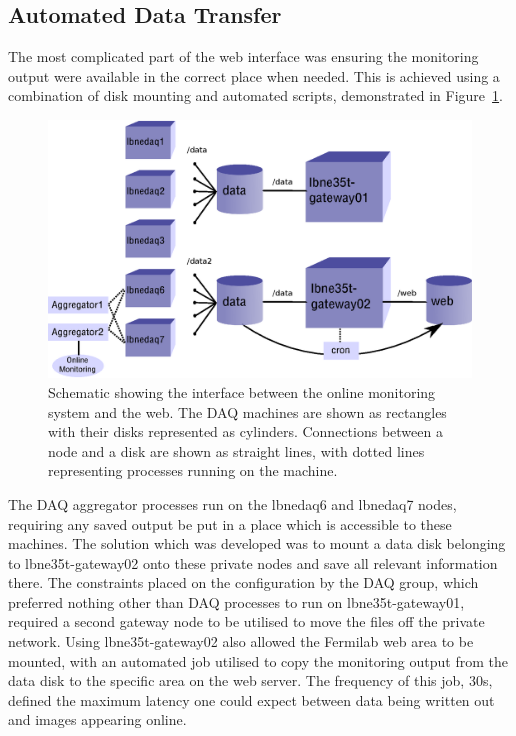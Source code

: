 \subsection{Automated Data Transfer}\label{sec:AutomatedDataTransfer}

The most complicated part of the web interface was ensuring the monitoring output were available in the correct place when needed.  This is achieved using a combination of disk mounting and automated scripts, demonstrated in Figure~\ref{fig:WebInterface}.

\begin{figure}
  \centering
  \includegraphics[width=12cm]{webInterface.eps}
  \caption[Schematic showing the interface between the online monitoring system and the web]{Schematic showing the interface between the online monitoring system and the web.  The DAQ machines are shown as rectangles with their disks represented as cylinders.  Connections between a node and a disk are shown as straight lines, with dotted lines representing processes running on the machine.}
  \label{fig:WebInterface}
\end{figure}

The DAQ aggregator processes run on the lbnedaq6 and lbnedaq7 nodes, requiring any saved output be put in a place which is accessible to these machines.  The solution which was developed was to mount a data disk belonging to lbne35t-gateway02 onto these private nodes and save all relevant information there.  The constraints placed on the configuration by the DAQ group, which preferred nothing other than DAQ processes to run on lbne35t-gateway01, required a second gateway node to be utilised to move the files off the private network.  Using lbne35t-gateway02 also allowed the Fermilab web area to be mounted, with an automated job utilised to copy the monitoring output from the data disk to the specific area on the web server.  The frequency of this job, 30s, defined the maximum latency one could expect between data being written out and images appearing online.

